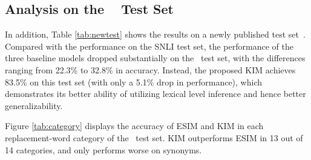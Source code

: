\documentclass[11pt,a4paper]{article}
\begin{document}
\subsection{Analysis on the ~\citep{glockner_acl18} Test Set}
In addition, Table \ref{tab:newtest} shows the results on a newly published test set~\citep{glockner_acl18}. Compared with the performance on the SNLI test set, the performance of the three baseline models dropped substantially on the~\citep{glockner_acl18} test set, with the differences ranging from 22.3\% to 32.8\% in accuracy. Instead, the proposed KIM achieves 83.5\% on this test set (with only a 5.1\% drop in performance), which demonstrates its better ability of utilizing lexical level inference and hence better generalizability.

Figure \ref{tab:category} displays the accuracy of ESIM and KIM in each replacement-word category of  the~\citep{glockner_acl18} test set. KIM outperforms ESIM in 13 out of 14 categories, and only performs worse on synonyms. 

\begin{table}[t!]
\renewcommand{\arraystretch}{0.9}
\begin{center}
\end{center}
\caption{Accuracies of models on the SNLI and ~\citep{glockner_acl18} test set. * indicates the results taken from \citep{glockner_acl18}.}
\label{tab:newtest}
\end{table}
\end{document}
